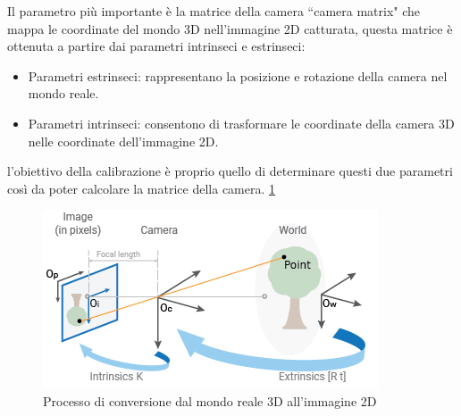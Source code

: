 \documentclass[12pt,a4paper,openright,twoside]{book}
\begin{document}
Il parametro più importante è la matrice della camera ``camera matrix" che mappa le coordinate del mondo 3D nell'immagine 2D catturata, questa matrice è ottenuta a partire dai parametri intrinseci e estrinseci:
\begin{itemize}
	\item Parametri estrinseci: rappresentano la posizione e rotazione della camera nel mondo reale.
	\item Parametri intrinseci: consentono di trasformare le coordinate della camera 3D nelle coordinate dell'immagine 2D.
\end{itemize}
l'obiettivo della calibrazione è proprio quello di determinare questi due parametri così da poter calcolare la matrice della camera. \ref{fig:calibration_cameramodel_coords}
\begin{figure}[h!]
	\centering
	\includegraphics[width=0.5\linewidth]{./figures/calibration-cameramodel-coords.png}
	\caption{Processo di conversione dal mondo reale 3D all'immagine 2D}
	\label{fig:calibration_cameramodel_coords}
\end{figure}
\end{document}
